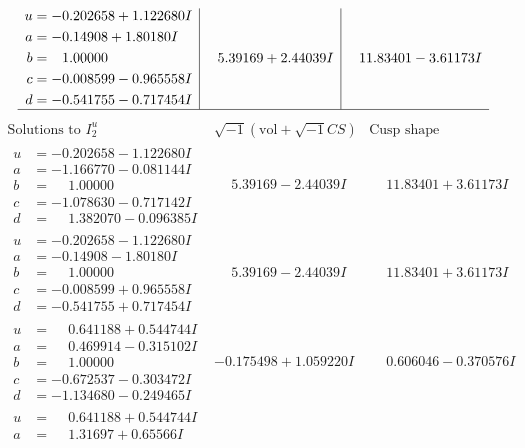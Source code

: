 \documentclass[1p]{elsarticle_modified}
\theoremstyle{definition}
\newcommand{\I}{\sqrt{-1}}
\begin{document}
$$\begin{array}{c|c|c}
\begin{aligned}
u &= -0.202658 + 1.122680 I \\
a &= -0.14908 + 1.80180 I \\
b &= \phantom{-}1.00000\phantom{ +0.000000I} \\
c &= -0.008599 - 0.965558 I \\
d &= -0.541755 - 0.717454 I\end{aligned}
 & \phantom{-}5.39169 + 2.44039 I & \phantom{-}11.83401 - 3.61173 I\\
 \hline 
 \end{array}$$\newpage$$\begin{array}{c|c|c}  
\text{Solutions to }I^u_{2}& \I (\text{vol} + \sqrt{-1}CS) & \text{Cusp shape}\\
 \hline 
\begin{aligned}
u &= -0.202658 - 1.122680 I \\
a &= -1.166770 - 0.081144 I \\
b &= \phantom{-}1.00000\phantom{ +0.000000I} \\
c &= -1.078630 - 0.717142 I \\
d &= \phantom{-}1.382070 - 0.096385 I\end{aligned}
 & \phantom{-}5.39169 - 2.44039 I & \phantom{-}11.83401 + 3.61173 I \\ \hline\begin{aligned}
u &= -0.202658 - 1.122680 I \\
a &= -0.14908 - 1.80180 I \\
b &= \phantom{-}1.00000\phantom{ +0.000000I} \\
c &= -0.008599 + 0.965558 I \\
d &= -0.541755 + 0.717454 I\end{aligned}
 & \phantom{-}5.39169 - 2.44039 I & \phantom{-}11.83401 + 3.61173 I \\ \hline\begin{aligned}
u &= \phantom{-}0.641188 + 0.544744 I \\
a &= \phantom{-}0.469914 - 0.315102 I \\
b &= \phantom{-}1.00000\phantom{ +0.000000I} \\
c &= -0.672537 - 0.303472 I \\
d &= -1.134680 - 0.249465 I\end{aligned}
 & -0.175498 + 1.059220 I & \phantom{-}0.606046 - 0.370576 I \\ \hline\begin{aligned}
u &= \phantom{-}0.641188 + 0.544744 I \\
a &= \phantom{-}1.31697 + 0.65566 I \\

\end{aligned}
\end{array}$$
\end{document}
